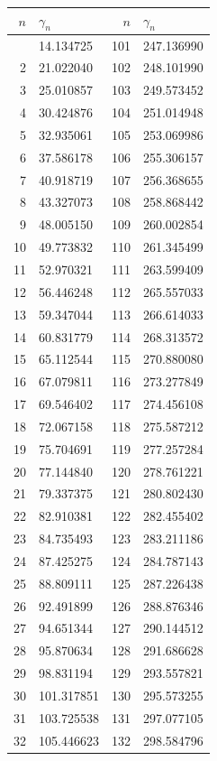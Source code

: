 \documentclass[11pt,a4paper]{article}
\begin{document}
\begin{longtable}{@{}rlrl@{}}
\toprule
$n$ & $\gamma_n$ & $n$ & $\gamma_n$ \\
\midrule
\endfirsthead
\bottomrule
\endfoot
1 & 14.134725 & 101 & 247.136990 \\
2 & 21.022040 & 102 & 248.101990 \\
3 & 25.010857 & 103 & 249.573452 \\
4 & 30.424876 & 104 & 251.014948 \\
5 & 32.935061 & 105 & 253.069986 \\
6 & 37.586178 & 106 & 255.306157 \\
7 & 40.918719 & 107 & 256.368655 \\
8 & 43.327073 & 108 & 258.868442 \\
9 & 48.005150 & 109 & 260.002854 \\
10 & 49.773832 & 110 & 261.345499 \\
11 & 52.970321 & 111 & 263.599409 \\
12 & 56.446248 & 112 & 265.557033 \\
13 & 59.347044 & 113 & 266.614033 \\
14 & 60.831779 & 114 & 268.313572 \\
15 & 65.112544 & 115 & 270.880080 \\
16 & 67.079811 & 116 & 273.277849 \\
17 & 69.546402 & 117 & 274.456108 \\
18 & 72.067158 & 118 & 275.587212 \\
19 & 75.704691 & 119 & 277.257284 \\
20 & 77.144840 & 120 & 278.761221 \\
21 & 79.337375 & 121 & 280.802430 \\
22 & 82.910381 & 122 & 282.455402 \\
23 & 84.735493 & 123 & 283.211186 \\
24 & 87.425275 & 124 & 284.787143 \\
25 & 88.809111 & 125 & 287.226438 \\
26 & 92.491899 & 126 & 288.876346 \\
27 & 94.651344 & 127 & 290.144512 \\
28 & 95.870634 & 128 & 291.686628 \\
29 & 98.831194 & 129 & 293.557821 \\
30 & 101.317851 & 130 & 295.573255 \\
31 & 103.725538 & 131 & 297.077105 \\
32 & 105.446623 & 132 & 298.584796 \\

\end{longtable}
\end{document}
